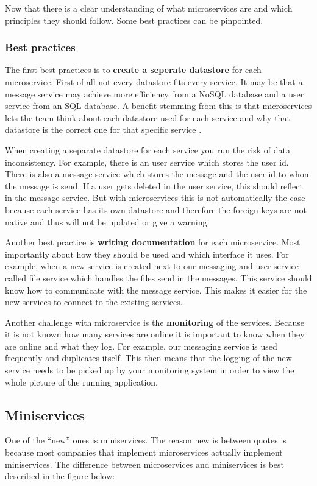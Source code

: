 Now that there is a clear understanding of what microservices are and which principles
they should follow. Some best practices can be pinpointed.

\subsubsection{Best practices}
The first best practices is to \textbf{create a seperate datastore} for each microservice. First of all not every datastore fits every service. It may be that a message service may achieve more efficiency from a NoSQL database and a user service from an SQL database. A benefit stemming from this is that microservices lets the team think about each datastore used for each service and why that datastore is the correct one for that specific service \cite{microservicesNetflix}.

When creating a separate datastore for each service you run the risk of data inconsistency. For example, there is an user service which stores the user id. There is also a message service which stores the message and the user id to whom the message is send. If a user gets deleted in the user service, this should reflect in the message service. But with microservices this is not automatically the case because each service has its own datastore and therefore the foreign keys are not native and thus will not be updated or give a warning.

Another best practice is \textbf{writing documentation} \cite{microservicesBestPractice} for each microservice. Most importantly about how they should be used and which interface it uses. For example, when a new service is created next to our messaging and user service called file service which handles the files send in the messages. This service should know how to communicate with the message service. This makes it easier for the new services to connect to the existing services.

Another challenge with microservice is the \textbf{monitoring} \cite{microservicesBestPractice} of the services. Because it is not known how many services are online it is important to know when they are online and what they log. For example, our messaging service is used frequently and duplicates itself. This then means that the logging of the new service needs to be picked up by your monitoring system in order to view the whole picture of the running application.

\subsection{Miniservices}
One of the “new” ones is miniservices. The reason new is between quotes is because most companies that implement microservices actually implement miniservices. The difference between microservices and miniservices is best described in the figure below:

